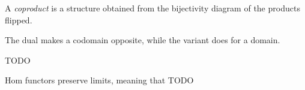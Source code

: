 \begin{definition}[Coproduct]
A \emph{coproduct} is a structure obtained from the bijectivity diagram of the products flipped.
\end{definition}
\begin{remark}
The dual makes a codomain opposite, while the variant does for a domain.
\end{remark}

\begin{definition}
TODO
\end{definition}

\begin{proposition}[HFPL]
    Hom functors preserve limits, meaning that TODO
\end{proposition}

